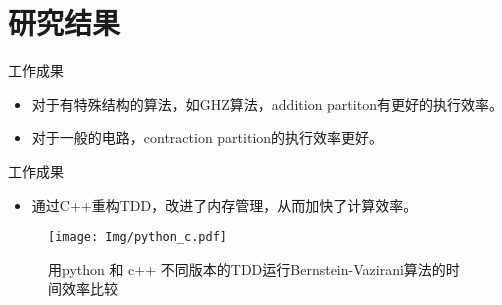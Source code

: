 \documentclass[aspectratio=1610]{ctexbeamer}
\begin{document}
\section{研究结果}

\begin{frame}{工作成果}
    \begin{table}[]
        \caption{对不同量子算法计算一步迁移的时间消耗}
    \end{table}
    \begin{itemize}
        \item 对于有特殊结构的算法，如GHZ算法，addition partiton有更好的执行效率。
        \item 对于一般的电路，contraction partition的执行效率更好。
    \end{itemize}
\end{frame}
\begin{frame}{工作成果}
    \begin{itemize}
        \item 通过C++重构TDD，改进了内存管理，从而加快了计算效率。
    \end{itemize}
    \begin{figure}
        \texttt{[image: Img/python\_c.pdf]}
        \caption{用python 和 c++ 不同版本的TDD运行Bernstein-Vazirani算法的时间效率比较}
    \end{figure}
\end{frame}
\end{document}
